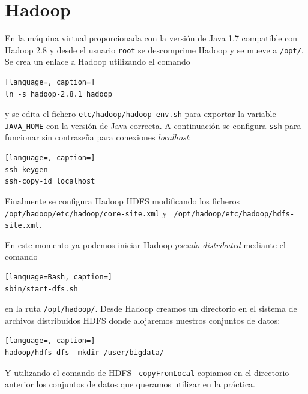 \documentclass[10pt,swedish, openany]{book}
\begin{document}
\tableofcontents{}

\clearpage


\clearpage


\mainmatter




\chapter{Hadoop}

En la máquina virtual proporcionada con la versión de Java 1.7 compatible con Hadoop 2.8 y desde el usuario \texttt{root} se descomprime Hadoop y se mueve a \texttt{/opt/}. Se crea un enlace a Hadoop utilizando el comando 
\begin{lstlisting}[language=, caption=]
ln -s hadoop-2.8.1 hadoop
\end{lstlisting}
y se edita el fichero \texttt{etc/hadoop/hadoop-env.sh} para exportar la variable \texttt{JAVA\_HOME} con la versión de Java correcta. A continuación se configura \texttt{ssh} para funcionar sin contraseña para conexiones \textit{localhost}:
  \begin{lstlisting}[language=, caption=]
ssh-keygen 
ssh-copy-id localhost
\end{lstlisting}

Finalmente se configura Hadoop HDFS modificando los ficheros \texttt{ /opt/hadoop/etc/hadoop/core-site.xml} y \texttt{ /opt/hadoop/etc/hadoop/hdfs-site.xml}.

En este momento ya podemos iniciar Hadoop \textit{pseudo-distributed} mediante el comando
\begin{lstlisting}[language=Bash, caption=]
sbin/start-dfs.sh
\end{lstlisting}
en la ruta \texttt{/opt/hadoop/}.
Desde Hadoop creamos un directorio en el sistema de archivos distribuidos HDFS donde alojaremos nuestros conjuntos de datos:
  \begin{lstlisting}[language=, caption=]
hadoop/hdfs dfs -mkdir /user/bigdata/
\end{lstlisting}

Y utilizando el comando de HDFS \texttt{-copyFromLocal} copiamos en el directorio anterior los conjuntos de datos que queramos utilizar en la práctica. 
\end{document}
